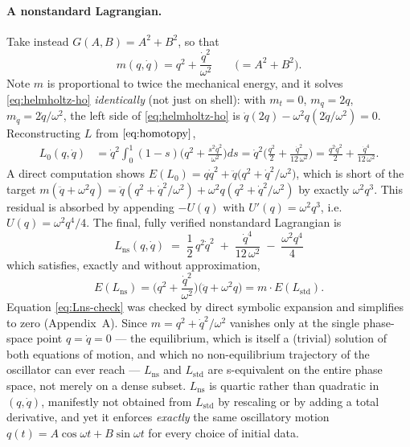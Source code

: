 \documentclass[11pt]{article}
\theoremstyle{remark}
\begin{document}
\paragraph{A nonstandard Lagrangian.} Take instead $G(A,B)=A^2+B^2$, so that
\begin{equation}
m(q,\dot q) = q^2+\frac{\dot q^2}{\omega^2}\qquad \Big(=A^2+B^2\Big).
\label{eq:m-ho}
\end{equation}
Note $m$ is proportional to twice the mechanical energy, and it solves \eqref{eq:helmholtz-ho} \emph{identically} (not just on shell): with $m_t=0$, $m_q=2q$, $m_{\dot q}=2\dot q/\omega^2$, the left side of \eqref{eq:helmholtz-ho} is $\dot q(2q)-\omega^2 q(2\dot q/\omega^2)=0$. Reconstructing $L$ from $\eqref{eq:homotopy}$,
\begin{align}
L_0(q,\dot q) &= \dot q^2\int_0^1(1-s)\Big(q^2+\frac{s^2\dot q^2}{\omega^2}\Big)ds
= \dot q^2\Big(\frac{q^2}{2}+\frac{\dot q^2}{12\,\omega^2}\Big)
= \frac{q^2\dot q^2}{2}+\frac{\dot q^4}{12\,\omega^2}.
\end{align}
A direct computation shows $E(L_0)= q\dot q^2+\ddot q\big(q^2+\dot q^2/\omega^2\big)$, which is short of the target $m(\ddot q+\omega^2 q)=\ddot q(q^2+\dot q^2/\omega^2)+\omega^2 q(q^2+\dot q^2/\omega^2)$ by exactly $\omega^2 q^3$. This residual is absorbed by appending $-U(q)$ with $U'(q)=\omega^2 q^3$, i.e.\ $U(q)=\omega^2 q^4/4$. The final, fully verified nonstandard Lagrangian is
\begin{equation}
\boxed{\ L_{\mathrm{ns}}(q,\dot q) \;=\; \frac12\,q^2\dot q^2 \;+\;\frac{\dot q^4}{12\,\omega^2}\;-\;\frac{\omega^2 q^4}{4}\ }
\label{eq:Lns}
\end{equation}
which satisfies, exactly and without approximation,
\begin{equation}
E(L_{\mathrm{ns}}) = \Big(q^2+\frac{\dot q^2}{\omega^2}\Big)\big(\ddot q+\omega^2 q\big) = m\cdot E(L_{\mathrm{std}}) .
\label{eq:Lns-check}
\end{equation}
Equation \eqref{eq:Lns-check} was checked by direct symbolic expansion and simplifies to zero (Appendix~A). Since $m=q^2+\dot q^2/\omega^2$ vanishes only at the single phase-space point $q=\dot q=0$ --- the equilibrium, which is itself a (trivial) solution of both equations of motion, and which no non-equilibrium trajectory of the oscillator can ever reach --- $L_{\mathrm{ns}}$ and $L_{\mathrm{std}}$ are s-equivalent on the entire phase space, not merely on a dense subset. $L_{\mathrm{ns}}$ is quartic rather than quadratic in $(q,\dot q)$, manifestly not obtained from $L_{\mathrm{std}}$ by rescaling or by adding a total derivative, and yet it enforces \emph{exactly} the same oscillatory motion $q(t)=A\cos\omega t+B\sin\omega t$ for every choice of initial data.
\end{document}

